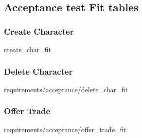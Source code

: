 \subsection{Acceptance test Fit tables}

\subsubsection{Create Character}
{create_char_fit}

\subsubsection{Delete Character}
{requirements/acceptance/delete_char_fit}

\subsubsection{Offer Trade}
{requirements/acceptance/offer_trade_fit}